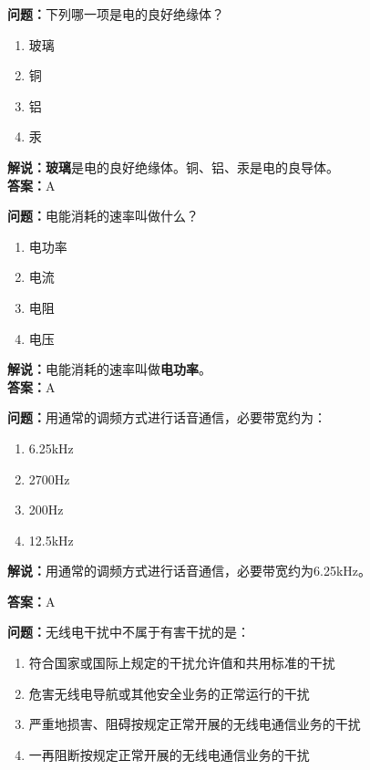 \textbf{问题：}下列哪一项是电的良好绝缘体？

\begin{enumerate}[label=\Alph*), leftmargin=1.5cm]
	\item 玻璃
	\item 铜
	\item 铝
	\item 汞
\end{enumerate}

\textbf{解说：}\textbf{玻璃}是电的良好绝缘体。铜、铝、汞是电的良导体。\\\textbf{答案：}A



\textbf{问题：}电能消耗的速率叫做什么？

\begin{enumerate}[label=\Alph*), leftmargin=1.5cm]
	\item 电功率
	\item 电流
	\item 电阻
	\item 电压
\end{enumerate}

\textbf{解说：}电能消耗的速率叫做\textbf{电功率}。\\\textbf{答案：}A



\textbf{问题：}用通常的调频方式进行话音通信，必要带宽约为：

\begin{enumerate}[label=\Alph*), leftmargin=1.5cm]
	\item 6.25kHz
	\item 2700Hz
	\item 200Hz
	\item 12.5kHz
\end{enumerate}

\textbf{解说：}用通常的调频方式进行话音通信，必要带宽约为6.25kHz。%

\textbf{答案：}A

\textbf{问题：}无线电干扰中不属于有害干扰的是：

\begin{enumerate}[label=\Alph*), leftmargin=1.5cm]
	\item 符合国家或国际上规定的干扰允许值和共用标准的干扰
	\item 危害无线电导航或其他安全业务的正常运行的干扰
	\item 严重地损害、阻碍按规定正常开展的无线电通信业务的干扰
	\item 一再阻断按规定正常开展的无线电通信业务的干扰
\end{enumerate}

